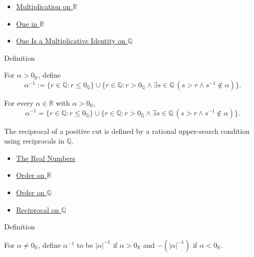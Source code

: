 \begin{dependencies}
\begin{itemize}
  \item \hyperref[def:multiplication-on-r]{Multiplication on $\mathbb{R}$}
  \item \hyperref[def:one-in-r]{One in $\mathbb{R}$}
  \item \hyperref[thm:one-multiplicative-identity-on-q]{One Is a Multiplicative Identity on $\mathbb{Q}$}
\end{itemize}
\end{dependencies}

\begin{definitionbox}{Definition}
\begin{definition}
\label{def:reciprocal-positive-on-r}
For $\alpha>0_{\mathbb{R}}$, define
\[
\alpha^{-1}:=\{r\in\mathbb{Q}:r\le 0_{\mathbb{Q}}\}
\cup
\{r\in\mathbb{Q}:r>0_{\mathbb{Q}}\land \exists s\in\mathbb{Q}\,(s>r\land s^{-1}\notin\alpha)\}.
\]
\end{definition}
\end{definitionbox}

\begin{remark*}
For every $\alpha\in\mathbb{R}$ with $\alpha>0_{\mathbb{R}}$,
\[
\alpha^{-1}
=\{r\in\mathbb{Q}:r\le 0_{\mathbb{Q}}\}
\cup
\{r\in\mathbb{Q}:r>0_{\mathbb{Q}}\land
\exists s\in\mathbb{Q}\,(s>r\land s^{-1}\notin\alpha)\}.
\]
\end{remark*}

\begin{remark*}[Interpretation]
The reciprocal of a positive cut is defined by a rational upper-search
condition using reciprocals in $\mathbb{Q}$.
\end{remark*}

\begin{dependencies}
\begin{itemize}
  \item \hyperref[def:reals]{The Real Numbers}
  \item \hyperref[def:order-on-r]{Order on $\mathbb{R}$}
  \item \hyperref[def:order-on-q]{Order on $\mathbb{Q}$}
  \item \hyperref[def:reciprocal-on-q-classes]{Reciprocal on $\mathbb{Q}$}
\end{itemize}
\end{dependencies}

\begin{definitionbox}{Definition}
\begin{definition}
\label{def:reciprocal-on-r}
For $\alpha\ne0_{\mathbb{R}}$, define $\alpha^{-1}$ to be $|\alpha|^{-1}$ if
$\alpha>0_{\mathbb{R}}$ and $-(|\alpha|^{-1})$ if $\alpha<0_{\mathbb{R}}$.
\end{definition}
\end{definitionbox}


